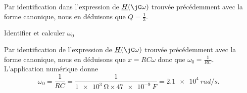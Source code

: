 
\begin{corrige}
	Par identification dans l'expression de $\underline{H}(\jC \omega)$ trouvée précédemment avec la forme canonique, nous en déduisons que $Q= \frac{1}{3}$.
\end{corrige}



\begin{enonce}
	Identifier et calculer $\omega_0$
\end{enonce}


\begin{corrige}
	Par identification de l'expression de $\underline{H}(\jC \omega)$ trouvée précédemment avec la forme canonique, nous en déduisons que $x = RC \omega$ donc que $\omega_0= \frac{1}{RC}$. L'application numérique donne
	\[ 
	\omega_0=\frac{1}{RC} = \frac{1}{ \SI{1e3}{\ohm} \times \SI{47e-9}{F} } = \SI{2.1e4}{rad/s}.
	\]
\end{corrige}


\finEntrainement








\hauteurLargeurCadreReponse		{7mm}{6cm}
\initialisationEntrainement


